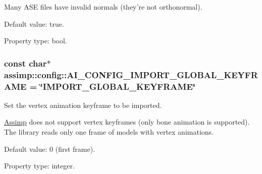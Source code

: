 Many A\+S\+E files have invalid normals (they're not orthonormal).

Default value\+: true.

Property type\+: bool. \hypertarget{namespaceassimp_1_1config_afea36345c8216f47ec1dad277672706d}{
\subsubsection[{A\+I\+\_\+\+C\+O\+N\+F\+I\+G\+\_\+\+I\+M\+P\+O\+R\+T\+\_\+\+G\+L\+O\+B\+A\+L\+\_\+\+K\+E\+Y\+F\+R\+A\+M\+E}]{\setlength{\rightskip}{0pt plus 5cm}const char$\ast$ assimp\+::config\+::\+A\+I\+\_\+\+C\+O\+N\+F\+I\+G\+\_\+\+I\+M\+P\+O\+R\+T\+\_\+\+G\+L\+O\+B\+A\+L\+\_\+\+K\+E\+Y\+F\+R\+A\+M\+E = \char`\"{}I\+M\+P\+O\+R\+T\+\_\+\+G\+L\+O\+B\+A\+L\+\_\+\+K\+E\+Y\+F\+R\+A\+M\+E\char`\"{}}}\label{namespaceassimp_1_1config_afea36345c8216f47ec1dad277672706d}
Set the vertex animation keyframe to be imported.

\hyperlink{class_assimp}{Assimp} does not support vertex keyframes (only bone animation is supported). The library reads only one frame of models with vertex animations.

Default value\+: 0 (first frame).

Property type\+: integer.

